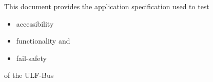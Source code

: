 This document provides the application specification used to test 

\begin{itemize}
\item accessibility
\item functionality and
\item fail-safety
\end{itemize}
of the ULF-Bus
